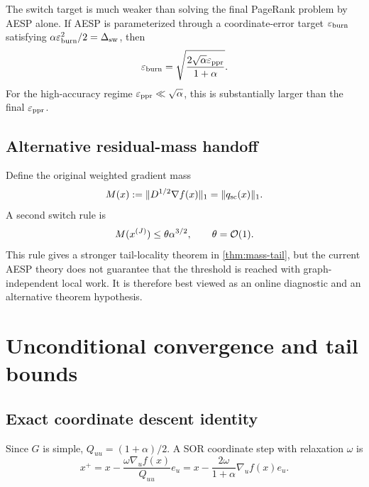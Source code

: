 \begin{remark}
The switch target is much weaker than solving the final PageRank problem by
AESP alone.  If AESP is parameterized through a coordinate-error target
$\varepsilon_{\mathrm{burn}}$ satisfying
$\alpha\varepsilon_{\mathrm{burn}}^2/2=\Delta_{\rm sw}$, then
\begin{equation}
  \varepsilon_{\mathrm{burn}}
  =\sqrt{\frac{2\sqrt\alpha\varepsilon_{\mathrm{ppr}}}{1+\alpha}}.
  \label{eq:burn-eps}
\end{equation}
For the high-accuracy regime $\varepsilon_{\mathrm{ppr}}\ll\sqrt\alpha$, this is substantially
larger than the final $\varepsilon_{\mathrm{ppr}}$.
\end{remark}

\subsection{Alternative residual-mass handoff}

Define the original weighted gradient mass
\begin{equation}
  M(x):=\lVert D^{1/2}\nabla f(x)\rVert_1=\lVert q_{\rm sc}(x)\rVert_1.
  \label{eq:mass-def}
\end{equation}
A second switch rule is
\begin{equation}
  M(x^{(J)})\leq\theta\alpha^{3/2},
  \qquad \theta=\mathcal{O}(1).
  \label{eq:mass-switch}
\end{equation}
This rule gives a stronger tail-locality theorem in
\cref{thm:mass-tail}, but the current AESP theory does not guarantee that the
threshold is reached with graph-independent local work.  It is therefore best
viewed as an online diagnostic and an alternative theorem hypothesis.

\section{Unconditional convergence and tail bounds}
\label{sec:tail}

\subsection{Exact coordinate descent identity}

Since $G$ is simple, $Q_{uu}=(1+\alpha)/2$.  A SOR coordinate step with
relaxation $\omega$ is
\begin{equation}
  x^+=x-\frac{\omega\nabla_u f(x)}{Q_{uu}}e_u
      =x-\frac{2\omega}{1+\alpha}\nabla_u f(x)e_u.
  \label{eq:sor-coordinate}
\end{equation}

